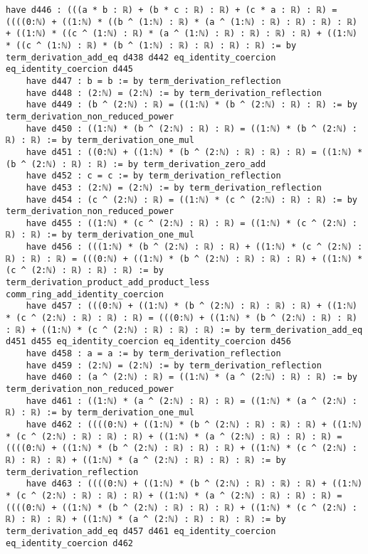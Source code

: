 \documentclass{article}
\begin{document}
\begin{tcolorbox}[colback=white!10, width=\linewidth]
\begin{lstlisting}[language=Lean4]
    have d446 : (((a * b : ℝ) + (b * c : ℝ) : ℝ) + (c * a : ℝ) : ℝ) = ((((0:ℕ) + ((1:ℕ) * ((b ^ (1:ℕ) : ℝ) * (a ^ (1:ℕ) : ℝ) : ℝ) : ℝ) : ℝ) + ((1:ℕ) * ((c ^ (1:ℕ) : ℝ) * (a ^ (1:ℕ) : ℝ) : ℝ) : ℝ) : ℝ) + ((1:ℕ) * ((c ^ (1:ℕ) : ℝ) * (b ^ (1:ℕ) : ℝ) : ℝ) : ℝ) : ℝ) := by term_derivation_add_eq d438 d442 eq_identity_coercion eq_identity_coercion d445
    have d447 : b = b := by term_derivation_reflection
    have d448 : (2:ℕ) = (2:ℕ) := by term_derivation_reflection
    have d449 : (b ^ (2:ℕ) : ℝ) = ((1:ℕ) * (b ^ (2:ℕ) : ℝ) : ℝ) := by term_derivation_non_reduced_power
    have d450 : ((1:ℕ) * (b ^ (2:ℕ) : ℝ) : ℝ) = ((1:ℕ) * (b ^ (2:ℕ) : ℝ) : ℝ) := by term_derivation_one_mul
    have d451 : ((0:ℕ) + ((1:ℕ) * (b ^ (2:ℕ) : ℝ) : ℝ) : ℝ) = ((1:ℕ) * (b ^ (2:ℕ) : ℝ) : ℝ) := by term_derivation_zero_add
    have d452 : c = c := by term_derivation_reflection
    have d453 : (2:ℕ) = (2:ℕ) := by term_derivation_reflection
    have d454 : (c ^ (2:ℕ) : ℝ) = ((1:ℕ) * (c ^ (2:ℕ) : ℝ) : ℝ) := by term_derivation_non_reduced_power
    have d455 : ((1:ℕ) * (c ^ (2:ℕ) : ℝ) : ℝ) = ((1:ℕ) * (c ^ (2:ℕ) : ℝ) : ℝ) := by term_derivation_one_mul
    have d456 : (((1:ℕ) * (b ^ (2:ℕ) : ℝ) : ℝ) + ((1:ℕ) * (c ^ (2:ℕ) : ℝ) : ℝ) : ℝ) = (((0:ℕ) + ((1:ℕ) * (b ^ (2:ℕ) : ℝ) : ℝ) : ℝ) + ((1:ℕ) * (c ^ (2:ℕ) : ℝ) : ℝ) : ℝ) := by term_derivation_product_add_product_less comm_ring_add_identity_coercion
    have d457 : (((0:ℕ) + ((1:ℕ) * (b ^ (2:ℕ) : ℝ) : ℝ) : ℝ) + ((1:ℕ) * (c ^ (2:ℕ) : ℝ) : ℝ) : ℝ) = (((0:ℕ) + ((1:ℕ) * (b ^ (2:ℕ) : ℝ) : ℝ) : ℝ) + ((1:ℕ) * (c ^ (2:ℕ) : ℝ) : ℝ) : ℝ) := by term_derivation_add_eq d451 d455 eq_identity_coercion eq_identity_coercion d456
    have d458 : a = a := by term_derivation_reflection
    have d459 : (2:ℕ) = (2:ℕ) := by term_derivation_reflection
    have d460 : (a ^ (2:ℕ) : ℝ) = ((1:ℕ) * (a ^ (2:ℕ) : ℝ) : ℝ) := by term_derivation_non_reduced_power
    have d461 : ((1:ℕ) * (a ^ (2:ℕ) : ℝ) : ℝ) = ((1:ℕ) * (a ^ (2:ℕ) : ℝ) : ℝ) := by term_derivation_one_mul
    have d462 : ((((0:ℕ) + ((1:ℕ) * (b ^ (2:ℕ) : ℝ) : ℝ) : ℝ) + ((1:ℕ) * (c ^ (2:ℕ) : ℝ) : ℝ) : ℝ) + ((1:ℕ) * (a ^ (2:ℕ) : ℝ) : ℝ) : ℝ) = ((((0:ℕ) + ((1:ℕ) * (b ^ (2:ℕ) : ℝ) : ℝ) : ℝ) + ((1:ℕ) * (c ^ (2:ℕ) : ℝ) : ℝ) : ℝ) + ((1:ℕ) * (a ^ (2:ℕ) : ℝ) : ℝ) : ℝ) := by term_derivation_reflection
    have d463 : ((((0:ℕ) + ((1:ℕ) * (b ^ (2:ℕ) : ℝ) : ℝ) : ℝ) + ((1:ℕ) * (c ^ (2:ℕ) : ℝ) : ℝ) : ℝ) + ((1:ℕ) * (a ^ (2:ℕ) : ℝ) : ℝ) : ℝ) = ((((0:ℕ) + ((1:ℕ) * (b ^ (2:ℕ) : ℝ) : ℝ) : ℝ) + ((1:ℕ) * (c ^ (2:ℕ) : ℝ) : ℝ) : ℝ) + ((1:ℕ) * (a ^ (2:ℕ) : ℝ) : ℝ) : ℝ) := by term_derivation_add_eq d457 d461 eq_identity_coercion eq_identity_coercion d462

\end{lstlisting}
\end{tcolorbox}
\end{document}

